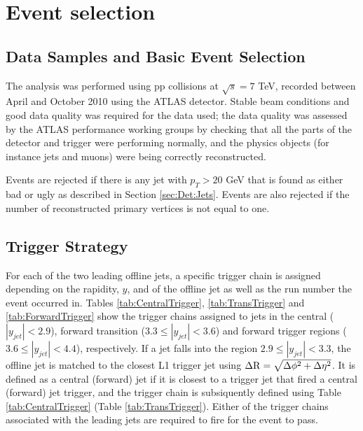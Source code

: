 \section {Event selection}
\label{sec:GBJ2:EvtSel}
\subsection{Data Samples and Basic Event Selection}
The analysis was performed using pp collisions at $\sqrt{s}=7$ TeV, recorded between April and October 2010 using the ATLAS detector.
Stable beam conditions and good data quality was required for the data used; the data quality was assessed by the ATLAS performance working groups by checking that all the parts of the detector and trigger were performing normally, and the physics objects (for instance jets and muons) were being correctly reconstructed. 

Events are rejected if there is any jet with $p_T>20$ GeV that is found as either bad or ugly as described in Section \ref{sec:Det:Jets}. 
Events are also rejected if the number of reconstructed primary vertices is not equal to one.


\subsection{Trigger Strategy}

For each of the two leading offline jets, a specific trigger chain is assigned depending on the rapidity, $y$, and \pt{} of the offline jet as well as the run number the event occurred in.
Tables \ref{tab:CentralTrigger}, \ref{tab:TransTrigger} and \ref{tab:ForwardTrigger} show the trigger chains assigned to jets in the central ($|y_{jet}|<2.9$), forward transition ($3.3\le|y_{jet}|<3.6$) and forward trigger regions ($3.6\le|y_{jet}|<4.4$), respectively.
If a jet falls into the region $2.9\le|y_{jet}|<3.3$, the offline jet is matched to the closest L1 trigger jet using $\mbox{$\Delta{\rm R}$}{}=\sqrt{\mbox{$\Delta{\rm \phi}$}{}^2 + \mbox{$\Delta{\rm \eta}$}{}^2}$.
It is defined as a central (forward) jet  if it is closest to a trigger jet that fired a central (forward) jet trigger, and the trigger chain is subsiquently defined using Table \ref{tab:CentralTrigger} (Table \ref{tab:TransTrigger}).
Either of the trigger chains associated with the leading jets are required to fire for the event to pass.


